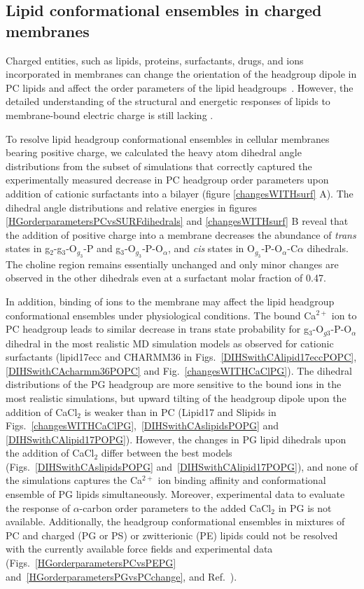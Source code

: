 \documentclass[aps,prl,superscriptaddress,twocolumn]{revtex4}
\begin{document}
\subsection{Lipid conformational ensembles in charged membranes}

Charged entities, such as lipids, proteins, surfactants, drugs, and ions incorporated in membranes can change the orientation of the headgroup dipole in PC lipids and affect the order parameters of the lipid headgroups~\cite{seelig87}. However, the detailed understanding of the structural and energetic responses of lipids to membrane-bound electric charge is still lacking \cite{Semchyschyn04}.

To resolve lipid headgroup conformational ensembles in cellular membranes bearing positive charge,
we calculated the heavy atom dihedral angle distributions from 
the subset of simulations %
that correctly captured the experimentally measured decrease in PC headgroup order parameters upon addition of cationic surfactants into a bilayer (figure \ref{changesWITHsurf} A).
The dihedral angle distributions and relative energies
in figures \ref{HGorderparametersPCvsSURFdihedrals} and \ref{changesWITHsurf} B reveal that the
addition of positive charge into a membrane 
decreases the abundance of \textit{trans} states in g$_2$-g$_3$-O$_{g_3}$-P and g$_3$-O$_{g_3}$-P-O$_\alpha$, and \textit{cis} states in O$_{g_3}$-P-O$_\alpha$-C$\alpha$ dihedrals.
The choline region remains essentially unchanged and only minor changes are observed in the other dihedrals even at a surfactant molar fraction of 0.47.

In addition, binding of ions to the membrane may affect the lipid headgroup conformational ensembles under physiological conditions.
The bound Ca$^{2+}$ ion to PC headgroup leads to similar decrease in trans state probability for g$_3$-O$_{g3}$-P-O$_\alpha$ dihedral
in the most realistic MD simulation models
as observed for cationic surfactants
(lipid17ecc and CHARMM36 in Figs.~\ref{DIHSwithCAlipid17eccPOPC}, \ref{DIHSwithCAcharmm36POPC} and Fig.~\ref{changesWITHCaClPG}).
The dihedral distributions of the PG headgroup are more sensitive to the bound ions in the most realistic simulations,
but upward tilting of the headgroup dipole upon the addition of CaCl$_2$ is weaker than in PC
(Lipid17 and Slipids in Figs.~\ref{changesWITHCaClPG},~\ref{DIHSwithCAslipidsPOPG} and \ref{DIHSwithCAlipid17POPG}).
However, the changes in PG lipid dihedrals upon the addition of CaCl$_2$ differ between the best models (Figs.~\ref{DIHSwithCAslipidsPOPG} and~\ref{DIHSwithCAlipid17POPG}), and none of the simulations captures the Ca$^{2+}$ ion binding affinity and conformational ensemble of PG lipids simultaneously. Moreover, experimental data to evaluate the response of $\alpha$-carbon order parameters to the added CaCl$_2$ in PG is not available.
Additionally, the headgroup conformational ensembles in mixtures of PC and charged (PG or PS) or zwitterionic (PE)
lipids could not be resolved with the currently available force fields and experimental data
(Figs.~\ref{HGorderparametersPCvsPEPG} and~\ref{HGorderparametersPGvsPCchange}, and Ref.~\cite{melcrova16,antila19,melcr20}).
\end{document}
